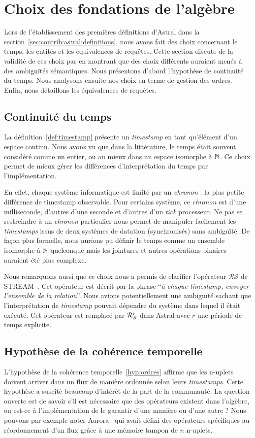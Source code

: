 \section{Choix des fondations de l'algèbre}
Lors de l'établissement des premières définitions d'Astral dans la section~\ref{sec:contrib:astral:definitions}, nous avons fait des choix concernant le temps, les entités et les équivalences de requêtes. Cette section discute de la validité de ces choix par en montrant que des choix différents auraient menés à des ambiguïtés sémantiques. Nous présentons d'abord l'hypothèse de continuité du temps. Nous analysons ensuite nos choix en terme de gestion des ordres. Enfin, nous détaillons les équivalences de requêtes.

\subsection{Continuité du temps}
La définition~\ref{def:timestamp} présente un \textit{timestamp} en tant qu'élément d'un espace continu. Nous avons vu que dans la littérature, le temps était souvent considéré comme un entier, ou au mieux dans un espace isomorphe à $\mathbb{N}$. Ce choix permet de mieux gérer les différences d'interprétation du temps par l'implémentation.

En effet, chaque système informatique est limité par un \textit{chronon} : la plus petite différence de timestamp observable. Pour certains système, ce \textit{chronon} est d'une milliseconde, d'autres d'une seconde et d'autres d'un \textit{tick} processeur. Ne pas se restreindre à un \textit{chronon} particulier nous permet de manipuler facilement les \textit{timestamps} issus de deux systèmes de datation (synchronisés) sans ambiguïté. De façon plus formelle, nous aurions pu définir le temps comme un ensemble isomorphe à $\mathbb{N}$ quelconque mais les jointures et autres opérations binaires auraient été plus complexe.

Nous remarquons aussi que ce choix nous a permis de clarifier l'opérateur $\mathcal{RS}$ de STREAM~\cite{Arasu:stream}. Cet opérateur est décrit par la phrase \enquote{\it à chaque timestamp, envoyer l'ensemble de la relation}. Nous avions potentiellement une ambiguïté sachant que l'interprétation de \textit{timestamp} pouvait dépendre du système dans lequel il était exécuté. Cet opérateur est remplacé par $\mathcal{R}_{\mathcal S}^{r}$ dans Astral avec $r$ une période de temps explicite.

\subsection{Hypothèse de la cohérence temporelle}
L'hypothèse de la cohérence temporelle~\ref{hyp:ordres} affirme que les n-uplets doivent arriver dans un flux de manière ordonnée selon leurs \textit{timestamps}. Cette hypothèse a suscité beaucoup d'intérêt de la part de la communauté. La question ouverte est de savoir s'il est nécessaire que des opérateurs existent dans l'algèbre, ou est-ce à l'implémentation de le garantir d'une manière ou d'une autre ? Nous pouvons par exemple noter Aurora~\cite{Abadi:aurora} qui avait défini des opérateurs spécifiques au réordonnement d'un flux grâce à une mémoire tampon de $n$ n-uplets.

